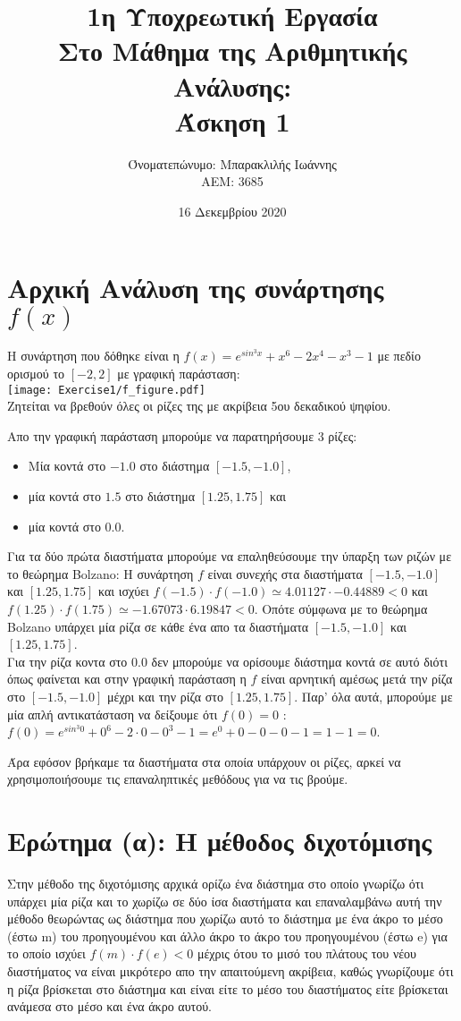 \documentclass[a4paper,11pt]{article}
\title{1η Υποχρεωτική Εργασία \\ Στο Μάθημα της Αριθμητικής Ανάλυσης: \\ Άσκηση 1}
\author{Όνοματεπώνυμο: Μπαρακλιλής Ιωάννης  \\  ΑΕΜ: 3685}
\date{16 Δεκεμβρίου 2020}
\newcommand{\lt}{\latintext}
\begin{document}
\maketitle

\section{Αρχική Ανάλυση της συνάρτησης \lt $f(x)$}

Η συνάρτηση που δόθηκε είναι η $f(x) = e^{sin^{3}x} + x^6 − 2x^4 − x^3 − 1$ με πεδίο ορισμού το $[-2,2]$ με γραφική παράσταση:\\
\texttt{[image: Exercise1/f\_figure.pdf]}\\
Ζητείται να βρεθούν όλες οι ρίζες της με ακρίβεια 5ου δεκαδικού ψηφίου.\\
\par
Απο την γραφική παράσταση μπορούμε να παρατηρήσουμε 3 ρίζες:\\
\begin{itemize}
    \item Μία κοντά στο $-1.0$ στο διάστημα $[-1.5, -1.0]$,
    \item μία κοντά στο $1.5$ στο διάστημα $[1.25, 1.75]$ και
    \item μία κοντά στο $0.0$.
\end{itemize}
Για τα δύο πρώτα διαστήματα μπορούμε να επαληθεύσουμε την ύπαρξη των ριζών με το θεώρημα {\lt Bolzano}: Η συνάρτηση $f$ είναι συνεχής στα διαστήματα $[-1.5, -1.0]$ και $[1.25, 1.75]$ και ισχύει $f(-1.5) \cdot f(-1.0) \simeq 4.01127 \cdot -0.44889 < 0$ και
$f(1.25) \cdot f(1.75) \simeq -1.67073 \cdot 6.19847 < 0$. Οπότε σύμφωνα με το θεώρημα {\lt Bolzano} υπάρχει μία ρίζα σε κάθε ένα απο τα διαστήματα $[-1.5, -1.0]$ και $[1.25, 1.75]$.\\

Για την ρίζα κοντα στο $0.0$ δεν μπορούμε να ορίσουμε διάστημα κοντά σε αυτό διότι όπως φαίνεται και στην γραφική παράσταση η $f$ είναι αρνητική αμέσως μετά την ρίζα στο $[-1.5, -1.0]$ μέχρι και την ρίζα στο $[1.25, 1.75]$. Παρ' όλα αυτά, μπορούμε με μία απλή αντικατάσταση να δείξουμε ότι $f(0) = 0$ : $f(0) = e^{sin^{3}0} + 0^6 - 2 \cdot 0 - 0^3 - 1 = e^0 + 0 - 0 - 0 - 1 = 1 - 1 = 0$.


Άρα εφόσον βρήκαμε τα διαστήματα στα οποία υπάρχουν οι ρίζες, αρκεί να χρησιμοποιήσουμε τις επαναληπτικές μεθόδους για να τις βρούμε.

\section{Ερώτημα (α): Η μέθοδος διχοτόμισης}
Στην μέθοδο της διχοτόμισης αρχικά ορίζω ένα διάστημα στο οποίο γνωρίζω ότι υπάρχει μία ρίζα και το χωρίζω σε δύο ίσα διαστήματα και επαναλαμβάνω αυτή την μέθοδο θεωρώντας ως διάστημα που χωρίζω αυτό το διάστημα με ένα άκρο το μέσο (έστω {\lt m}) του προηγουμένου και άλλο άκρο το άκρο του προηγουμένου (έστω {\lt e}) για το οποίο ισχύει $f(m) \cdot f(e) < 0$ μέχρις ότου το μισό του πλάτους του νέου διαστήματος να είναι μικρότερο απο την απαιτούμενη ακρίβεια, καθώς γνωρίζουμε ότι η ρίζα βρίσκεται στο διάστημα και είναι είτε το μέσο του διαστήματος είτε βρίσκεται ανάμεσα στο μέσο και ένα άκρο αυτού.
\end{document}
